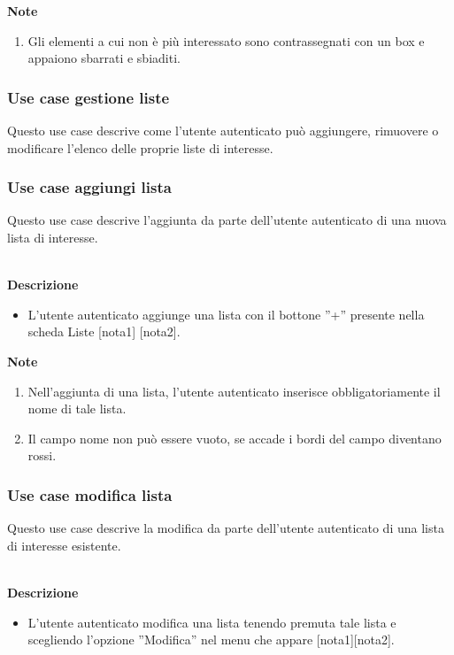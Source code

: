 \documentclass[a4paper,12pt]{article}
\begin{document}
\textbf{Note}
\begin{enumerate} \setlength\itemsep{0.01em}
\item Gli elementi a cui non è più interessato sono contrassegnati con un box e appaiono sbarrati e sbiaditi.
\end{enumerate}



\subsubsection*{Use case gestione liste}

Questo use case descrive come l'utente autenticato può aggiungere, rimuovere o modificare l'elenco delle proprie liste di interesse.


\subsubsection*{Use case aggiungi lista}

Questo use case descrive l'aggiunta da parte dell'utente autenticato di una nuova lista di interesse.

\textbf{\\Descrizione}
\begin{itemize} \setlength\itemsep{0.01em}
\item L'utente autenticato aggiunge una lista con il bottone ''+'' presente nella scheda Liste [nota1] [nota2].
\end{itemize}

\textbf{Note}
\begin{enumerate} \setlength\itemsep{0.01em}
\item Nell'aggiunta di una lista, l'utente autenticato inserisce obbligatoriamente il nome di tale lista.
\item Il campo nome non può essere vuoto, se accade i bordi del campo diventano rossi.
\end{enumerate}


\subsubsection*{Use case modifica lista}

Questo use case descrive la modifica da parte dell'utente autenticato di una lista di interesse esistente.

\textbf{\\Descrizione}
\begin{itemize} \setlength\itemsep{0.01em}
\item L'utente autenticato modifica una lista tenendo premuta tale lista e scegliendo l'opzione ''Modifica'' nel menu che appare [nota1][nota2].
\end{itemize}
\end{document}
